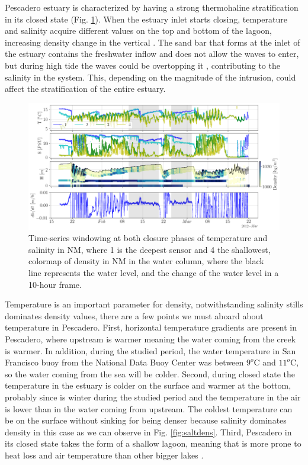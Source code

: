 \documentclass[tesis.tex]{subfiles}
\begin{document}
 Pescadero estuary is characterized by having a strong thermohaline stratification in its closed state (Fig. \ref{fig:saltemp}). When the estuary inlet starts closing, temperature and salinity acquire different values on the top and bottom of the lagoon, increasing density change in the vertical \citep{largier2015}. The sand bar that forms at the inlet of the estuary contains the freshwater inflow and does not allow the waves to enter, but during high tide the waves could be overtopping it \citep{laudier2011measured}, contributing to the salinity in the system. This, depending on the magnitude of the intrusion, could affect the stratification of the entire estuary.\\

\begin{figure}[h!]
    \centering
    \includegraphics[scale=0.5]{Imagenes/saltemp.png}
    \caption{Time-series windowing at both closure phases of temperature and salinity in NM, where 1 is the deepest sensor and 4 the shallowest, colormap of density in NM in the water column, where the black line represents the water level, and the change of the water level in a 10-hour frame.}
    \label{fig:saltemp}
\end{figure}

Temperature is an important parameter for density, notwithstanding salinity stills dominates density values, there are a few points we must aboard about temperature in Pescadero. First, horizontal temperature gradients are present in Pescadero, where upstream is warmer meaning the water coming from the creek is warmer. In addition, during the studied period, the water temperature in San Francisco buoy from the National Data Buoy Center was between $9^o$C and $11^o$C, so the water coming from the sea will be colder. Second, during closed state the temperature in the estuary is colder on the surface and warmer at the bottom, probably since is winter during the studied period and the temperature in the air is lower than in the water coming from upstream. The coldest temperature can be on the surface without sinking for being denser because salinity dominates density in this case as we can observe in Fig. \ref{fig:saltdens}. Third, Pescadero in its closed state takes the form of a shallow lagoon, meaning that is more prone to heat loss and air temperature than other bigger lakes \citep{peeters2009currents}.\\
\end{document}
